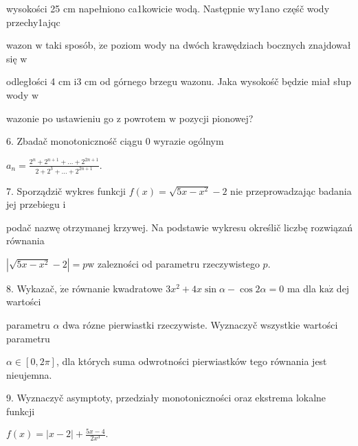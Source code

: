 \documentclass[a4paper,12pt]{article}
\begin{document}
wysokości 25 cm napełniono ca1kowicie wodą. Następnie wy1ano częśč wody przechy1ajqc

wazon $\mathrm{w}$ taki sposób, $\dot{\mathrm{z}}\mathrm{e}$ poziom wody na dwóch krawędziach bocznych znajdował się $\mathrm{w}$

odległości 4 cm $\mathrm{i}3$ cm od górnego brzegu wazonu. Jaka wysokośč będzie miał słup wody $\mathrm{w}$

wazonie po ustawieniu go $\mathrm{z}$ powrotem $\mathrm{w}$ pozycji pionowej?

6. Zbadač monotonicznośč ciągu $0$ wyrazie ogólnym

$a_{n}=\displaystyle \frac{2^{n}+2^{n+1}+\ldots+2^{2n+1}}{2+2^{3}+\ldots+2^{2n+1}}.$

7. Sporządzič wykres funkcji $f(x)=\sqrt{5x-x^{2}}-2$ nie przeprowadzając badania jej przebiegu $\mathrm{i}$

podač nazwę otrzymanej krzywej. Na podstawie wykresu określič liczbę rozwiązań równania

$|\sqrt{5x-x^{2}}-2|=p\mathrm{w}$ zalezności od parametru rzeczywistego $p.$

8. Wykazač, $\dot{\mathrm{z}}\mathrm{e}$ równanie kwadratowe $ 3x^{2}+4x\sin\alpha-\cos 2\alpha = 0$ ma dla $\mathrm{k}\mathrm{a}\dot{\mathrm{z}}$ dej wartości

parametru $\alpha$ dwa rózne pierwiastki rzeczywiste. Wyznaczyč wszystkie wartości parametru

$\alpha\in[0,2\pi]$, dla których suma odwrotności pierwiastków tego równania jest nieujemna.

9. Wyznaczyč asymptoty, przedziały monotoniczności oraz ekstrema lokalne funkcji

$f(x)=|x-2|+\displaystyle \frac{5x-4}{2x^{3}}.$
\end{document}
